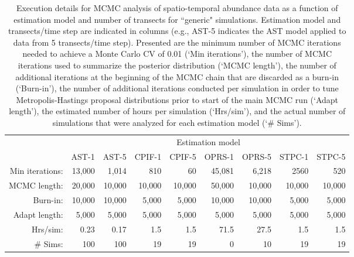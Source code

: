 \documentclass[12pt,fleqn]{article}
\begin{document}
\begin{flushleft}
\begin{table}
\caption{Execution details for MCMC analysis of spatio-temporal abundance data as a function of estimation model and number of transects for ``generic" simulations.  Estimation model and transects/time step are indicated in columns (e.g., AST-5 indicates the AST model applied to data from 5 transects/time step).  Presented are the minimum number of MCMC iterations needed to achieve a Monte Carlo CV of 0.01 (`Min iterations'), the number of MCMC iterations used to summarize the posterior distribution (`MCMC length'), the number of additional iterations at the beginning of the MCMC chain that are discarded as a burn-in (`Burn-in'), the number of additional iterations conducted per simulation in order to tune Metropolis-Hastings proposal distributions prior to start of the main MCMC run (`Adapt length'), the estimated number of hours per simulation (`Hrs/sim'), and the actual number of simulations that were analyzed for each estimation model (`\# Sims').}
\label{tab:run_times}
\begin{tabular}{rrrrrrrrr}
\\
 & \multicolumn{8}{c}{Estimation model} \\
 & AST-1 & AST-5 & CPIF-1 & CPIF-5 & OPRS-1 & OPRS-5 & STPC-1 & STPC-5 \\
\hline \hline
Min iterations:  & 13,000 & 1,014 & 810 & 60 & 45,081 & 6,218 & 2560 & 520 \\
MCMC length: & 20,000  & 10,000 & 10,000 & 10,000 & 50,000 & 10,000 & 10,000 & 10,000 \\
Burn-in: & 10,000 & 10,000 & 5,000 & 5,000 & 10,000 & 10,000 & 5,000 & 5,000 \\
Adapt length: & 5,000 & 5,000 & 5,000 & 5,000 & 5,000 & 5,000 & 5,000 & 5,000 \\
Hrs/sim:   & 0.23 & 0.17 & 1.5 & 1.5 & 71.5 & 27.5 & 1.5 & 1.5 \\
\# Sims:  & 100 & 100 & 19 & 19 & 0 & 10 & 19 & 19 \\
\hline
\end{tabular}
\end{table}

\pagebreak


\end{flushleft}
\end{document}
